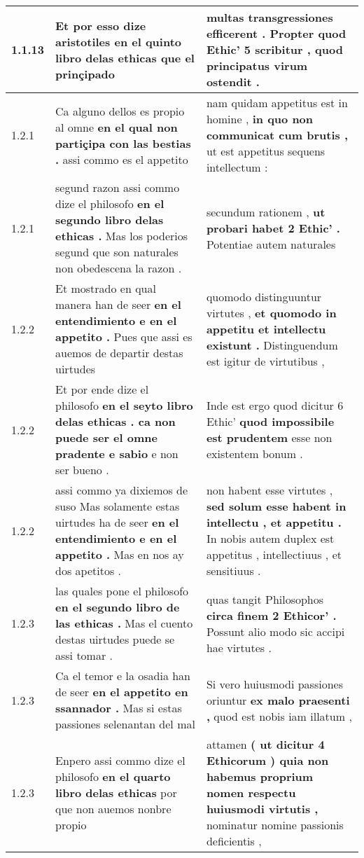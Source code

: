 \begin{tabular}{|p{1cm}|p{6.5cm}|p{6.5cm}|}
1.1.13 & Et por esso dize aristotiles \textbf{ en el quinto libro delas ethicas } que el prinçipado & multas transgressiones efficerent . \textbf{ Propter quod Ethic’ 5 scribitur , } quod principatus virum ostendit . \\\hline
1.2.1 & Ca alguno dellos es propio al omne \textbf{ en el qual non partiçipa con las bestias . } assi commo es el appetito & nam quidam appetitus est in homine , \textbf{ in quo non communicat cum brutis , } ut est appetitus sequens intellectum : \\\hline
1.2.1 & segund razon assi commo dize el philosofo \textbf{ en el segundo libro delas ethicas . } Mas los poderios segund que son naturales non obedescena la razon . & secundum rationem , \textbf{ ut probari habet 2 Ethic’ . } Potentiae autem naturales \\\hline
1.2.2 & Et mostrado en qual manera han de seer \textbf{ en el entendimiento e en el appetito . } Pues que assi es auemos de departir destas uirtudes & quomodo distinguuntur virtutes , \textbf{ et quomodo in appetitu et intellectu existunt . } Distinguendum est igitur de virtutibus , \\\hline
1.2.2 & Et por ende dize el philosofo \textbf{ en el seyto libro delas ethicas . ca non puede ser el omne pradente e sabio } e non ser bueno . & Inde est ergo quod dicitur 6 Ethic’ \textbf{ quod impossibile est prudentem } esse non existentem bonum . \\\hline
1.2.2 & assi commo ya dixiemos de suso Mas solamente estas uirtudes ha de seer \textbf{ en el entendimiento e en el appetito . } Mas en nos ay dos apetitos . & non habent esse virtutes , \textbf{ sed solum esse habent in intellectu , et appetitu . } In nobis autem duplex est appetitus , intellectiuus , et sensitiuus . \\\hline
1.2.3 & las quales pone el philosofo \textbf{ en el segundo libro de las ethicas . } Mas el cuento destas uirtudes puede se assi tomar . & quas tangit Philosophos \textbf{ circa finem 2 Ethicor’ . } Possunt alio modo sic accipi hae virtutes . \\\hline
1.2.3 & Ca el temor e la osadia han de seer \textbf{ en el appetito en ssannador . } Mas si estas passiones selenantan del mal & Si vero huiusmodi passiones oriuntur \textbf{ ex malo praesenti , } quod est nobis iam illatum , \\\hline
1.2.3 & Enpero assi commo dize el philosofo \textbf{ en el quarto libro delas ethicas } por que non auemos nonbre propio & attamen \textbf{ ( ut dicitur 4 Ethicorum ) quia non habemus proprium nomen respectu huiusmodi virtutis , } nominatur nomine passionis deficientis , \\\hline

\end{tabular}
